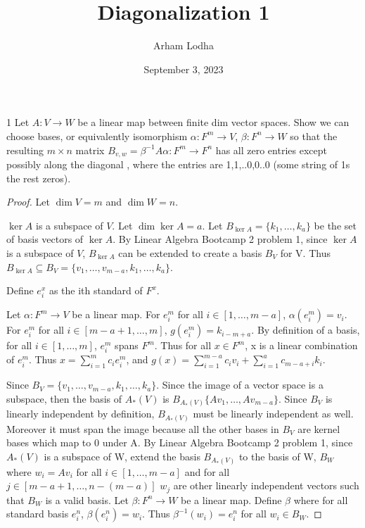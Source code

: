 \documentclass{article}
\newcommand{\rarr}[0]{\rightarrow}
\begin{document}
\title{Diagonalization 1}
\author{Arham Lodha}%
\date{September 3, 2023}%
\maketitle

\begin{PROB}{1}\label{Problem 1.}
    Let $A: V \to W$ be  a linear map between finite dim vector spaces. Show we can choose bases, or equivalently isomorphism  $\alpha: F^m \to V$, $\beta: F^n \rarr W$ so that the resulting $m \times n$ matrix $B_{v,w} =\beta^{-1} A \alpha : F^m \to F^n$  has all zero entries except possibly along the diagonal , where the entries are 1,1,..0,0..0  (some string of 1s the rest zeros).
\end{PROB}
\begin{proof}
    Let $\dim V = m$ and $\dim W = n$.

    $\ker A$ is a subspace of $V$. Let $\dim \ker A = a$. Let $B_{\ker A} = \{k_1, \ldots, k_a\}$ be the set of basis vectors of $\ker A$. By Linear Algebra Bootcamp 2 problem 1, since $\ker A$ is a subspace of $V$, $B_{\ker A}$ can be extended to create a basis $B_V$ for V. Thus $B_{\ker A} \subseteq B_V = \{v_1, \ldots, v_{m-a}, k_1, \ldots, k_a \}$. 

    Define $e^x_i$ as the ith standard of $F^x$.

    Let $\alpha: F^m \to V$ be a linear map. For $e^m_i$ for all $i \in [1, \ldots, m-a]$, $\alpha(e^m_i) = v_i$. For $e^m_i$ for all $i \in [m - a + 1, \ldots, m]$, $g(e^m_i) = k_{i - m + a}$. By definition of a basis, for all $i \in [1, \ldots, m]$, $e^m_i$ spans $F^m$. Thus for all $x \in F^m$, x is a linear combination of $e^m_i$. Thus $x = \sum_{i=1}^{m}c_ie^m_i$, and $g(x) = \sum_{i=1}^{m-a}c_iv_i + \sum_{i=1}^{a}c_{m-a + i}k_i$.

    Since $B_V = \{v_1, \ldots, v_{m-a}, k_1, \ldots, k_a\}$. Since the image of a vector space is a subspace, then the basis of $A_*(V)$ is $B_{A_*(V)}\{Av_1, \ldots, Av_{m-a}\}$. Since $B_V$ is linearly independent by definition, $B_{A_*(V)}$ must be linearly independent as well. Moreover it must span the image because all the other bases in $B_V$ are kernel bases which map to 0 under A. By Linear Algebra Bootcamp 2 problem 1, since $A_*(V)$ is a subspace of W, extend the basis $B_{A_*(V)}$ to the basis of W, $B_W$ where $w_i = Av_i$ for all $i \in [1, \ldots, m-a]$ and for all $j \in [m-a+1, \ldots, n-(m-a)]$ $w_j$ are other linearly independent vectors such that $B_W$ is a valid basis. Let $\beta: F^n \rarr W$ be a linear map. Define $\beta$ where for all standard basis $e^n_i$, $\beta(e^n_i) = w_i$. Thus $\beta^{-1}(w_i) = e^n_i$ for all $w_i \in B_W$.


\end{proof}
\end{document}
